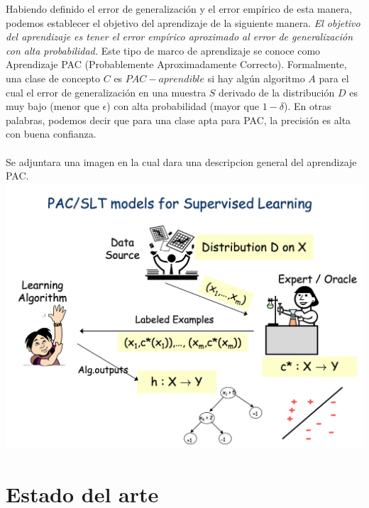 \documentclass{vgtc}                          %
\begin{document}
Habiendo definido el error de generalización y el error empírico de
esta manera, podemos establecer el objetivo del aprendizaje de la
siguiente manera.
\newline
\newline
\textit{El objetivo del aprendizaje es tener el error empírico
aproximado al error de generalización con alta probabilidad.}
\newline
\newline
Este tipo de marco de aprendizaje se conoce como Aprendizaje PAC
(Probablemente Aproximadamente Correcto). Formalmente, una clase de
concepto $C$ es $PAC-aprendible$ si hay algún algoritmo $A$ para el 
cual el error de generalización en una muestra $S$ derivado de la 
distribución $D$ es muy bajo (menor que $\epsilon$) con alta 
probabilidad (mayor que $1- \delta$). En otras palabras, podemos decir que para una
clase apta para PAC, la precisión es alta con buena confianza.
\\
\\
Se adjuntara una imagen en la cual dara una descripcion general del aprendizaje PAC.
\\
\includegraphics[scale=0.15]{pac.png} 
\section{Estado del arte}
\end{document}

